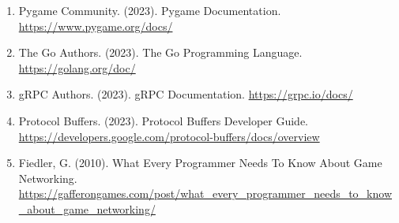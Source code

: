 \documentclass[11pt,letterpaper]{article}
\begin{document}
\begin{enumerate}
    \item Pygame Community. (2023). Pygame Documentation. \url{https://www.pygame.org/docs/}
    \item The Go Authors. (2023). The Go Programming Language. \url{https://golang.org/doc/}
    \item gRPC Authors. (2023). gRPC Documentation. \url{https://grpc.io/docs/}
    \item Protocol Buffers. (2023). Protocol Buffers Developer Guide. \url{https://developers.google.com/protocol-buffers/docs/overview}
    \item Fiedler, G. (2010). What Every Programmer Needs To Know About Game Networking. \url{https://gafferongames.com/post/what_every_programmer_needs_to_know_about_game_networking/}
\end{enumerate}
\end{document}
